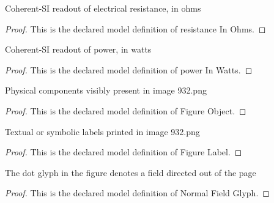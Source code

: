 \begin{definition}
  \label{def:physics:phyx-mini-0932:phyxminiproblems-problemphyxmini0932-resistanceinohms}
  Coherent-SI readout of electrical resistance, in ohms
\end{definition}
\begin{proof}
  This is the declared model definition of resistance In Ohms.
\end{proof}
\begin{definition}
  \label{def:physics:phyx-mini-0932:phyxminiproblems-problemphyxmini0932-powerinwatts}
  Coherent-SI readout of power, in watts
\end{definition}
\begin{proof}
  This is the declared model definition of power In Watts.
\end{proof}
\begin{definition}
  \label{def:physics:phyx-mini-0932:phyxminiproblems-problemphyxmini0932-figureobject}
  Physical components visibly present in image 932.png
\end{definition}
\begin{proof}
  This is the declared model definition of Figure Object.
\end{proof}
\begin{definition}
  \label{def:physics:phyx-mini-0932:phyxminiproblems-problemphyxmini0932-figurelabel}
  Textual or symbolic labels printed in image 932.png
\end{definition}
\begin{proof}
  This is the declared model definition of Figure Label.
\end{proof}
\begin{definition}
  \label{def:physics:phyx-mini-0932:phyxminiproblems-problemphyxmini0932-normalfieldglyph}
  The dot glyph in the figure denotes a field directed out of the page
\end{definition}
\begin{proof}
  This is the declared model definition of Normal Field Glyph.
\end{proof}
